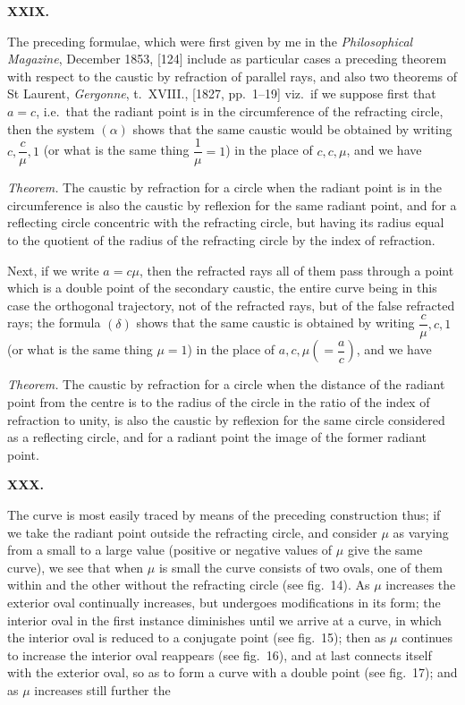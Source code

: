 \documentclass[11pt]{article}
\begin{document}
\newpage

\begin{center}\textbf{XXIX.}\end{center}
The preceding formulae, which were first given by me in the \textit{Philosophical Magazine}, December 1853, [124] include as particular cases a preceding theorem with respect to the caustic by refraction of parallel rays, and also two theorems of St Laurent, \textit{Gergonne}, t.\ XVIII., [1827, pp.\ 1--19] viz.\ if we suppose first that $a = c$, i.e.\ that the radiant point is in the circumference of the refracting circle, then the system $(\alpha)$ shows that the same caustic would be obtained by writing $c, \dfrac{c}{\mu}, 1$ (or what is the same thing $\dfrac{1}{\mu} = 1$) in the place of $c, c, \mu$, and we have

\textit{Theorem.} The caustic by refraction for a circle when the radiant point is in the circumference is also the caustic by reflexion for the same radiant point, and for a reflecting circle concentric with the refracting circle, but having its radius equal to the quotient of the radius of the refracting circle by the index of refraction.

Next, if we write $a = c\mu$, then the refracted rays all of them pass through a point which is a double point of the secondary caustic, the entire curve being in this case the orthogonal trajectory, not of the refracted rays, but of the false refracted rays; the formula $(\delta)$ shows that the same caustic is obtained by writing $\dfrac{c}{\mu}, c, 1$ (or what is the same thing $\mu = 1$) in the place of $a, c, \mu\!\left(= \dfrac{a}{c}\right)$, and we have

\textit{Theorem.} The caustic by refraction for a circle when the distance of the radiant point from the centre is to the radius of the circle in the ratio of the index of refraction to unity, is also the caustic by reflexion for the same circle considered as a reflecting circle, and for a radiant point the image of the former radiant point.

\bigskip
\begin{center}\textbf{XXX.}\end{center}
The curve is most easily traced by means of the preceding construction thus; if we take the radiant point outside the refracting circle, and consider $\mu$ as varying from a small to a large value (positive or negative values of $\mu$ give the same curve), we see that when $\mu$ is small the curve consists of two ovals, one of them within and the other without the refracting circle (see fig.\ 14). As $\mu$ increases the exterior oval continually increases, but undergoes modifications in its form; the interior oval in the first instance diminishes until we arrive at a curve, in which the interior oval is reduced to a conjugate point (see fig.\ 15); then as $\mu$ continues to increase the interior oval reappears (see fig.\ 16), and at last connects itself with the exterior oval, so as to form a curve with a double point (see fig.\ 17); and as $\mu$ increases still further the
\end{document}
